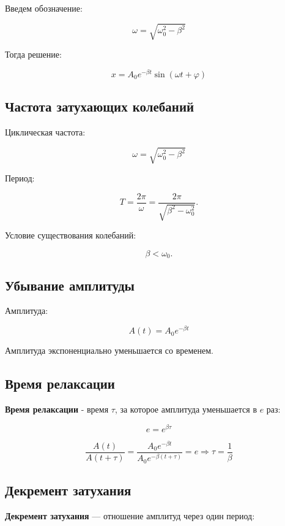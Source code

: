 \documentclass[a4paper,12pt]{article}
\begin{document}
Введем обозначение:

\[
\omega = \sqrt{\omega_0^2 - \beta^2}
\]

Тогда решение:

\[
x = A_0 e^{-\beta t} \sin(\omega t + \varphi)
\]

\subsection*{Частота затухающих колебаний}

Циклическая частота:

\[
\omega = \sqrt{\omega_0^2 - \beta^2}
\]

Период:

\[
T = \frac{2\pi}{\omega} = \frac{2\pi}{\sqrt{\beta^2 - \omega_0^2}}.
\]

Условие существования колебаний:

\[
\beta < \omega_0.
\]

\subsection*{Убывание амплитуды}

Амплитуда:

\[
A(t) = A_0 e^{-\beta t}
\]

Амплитуда экспоненциально уменьшается со временем.

\subsection*{Время релаксации}

\begin{definitionbox}
\textbf{Время релаксации} - время $\tau$, за которое амплитуда уменьшается в $e$ раз:
\end{definitionbox}

\[
e = e^{\beta\tau}
\]

\[
\frac{A(t)}{A(t+\tau)} 
=   
\frac{A_0 e^{-\beta t}}{A_0 e^{-\beta(t+\tau)}} = e
\Rightarrow  
\tau = \frac{1}{\beta}
\]


\subsection*{Декремент затухания}

\begin{definitionbox}
\textbf{Декремент затухания} — отношение амплитуд через один период:
\end{definitionbox}
\end{document}
